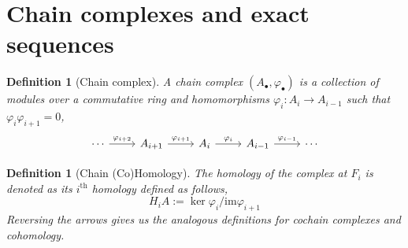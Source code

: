 \documentclass[12pt]{report}
\numberwithin{equation}{section}
\newcounter{dummy} \numberwithin{dummy}{section}
\newtheorem{theorem}[dummy]{Theorem}
\newtheorem{definition}[dummy]{Definition}
\begin{document}
%	
%
%
%	
%	
%	
	\section{Chain complexes and exact sequences}
	
	
	\begin{definition}[Chain complex]
		A {chain complex} $(A_\bullet, \varphi_\bullet)$ is a collection of modules over a commutative ring and homomorphisms $\varphi_i: A_i \to A_{i-1}$ such that $\varphi_i \varphi_{i+1}=0$,
		\[\begin{tikzcd}
			\cdots & {A_{i+1}} & {A_i} & {A_{i-1}} & \cdots
			\arrow["{\varphi_{i+1}}", from=1-2, to=1-3]
			\arrow["{\varphi_i}", from=1-3, to=1-4]
			\arrow["{\varphi_{i-1}}", from=1-4, to=1-5]
			\arrow["{\varphi_{i+2}}", from=1-1, to=1-2]
		\end{tikzcd}\]
	\end{definition}
	\begin{definition}[Chain (Co)Homology]
		The {homology} of the complex at $F_i$ is denoted as its $i^{\mathrm{th}}$ homology defined as follows,
		\[ H_iA := \ker \varphi_i/ \mathrm{im} \varphi_{i+1} \]
		Reversing the arrows gives us the analogous definitions for cochain complexes and cohomology.
	\end{definition}
	
\end{document}
